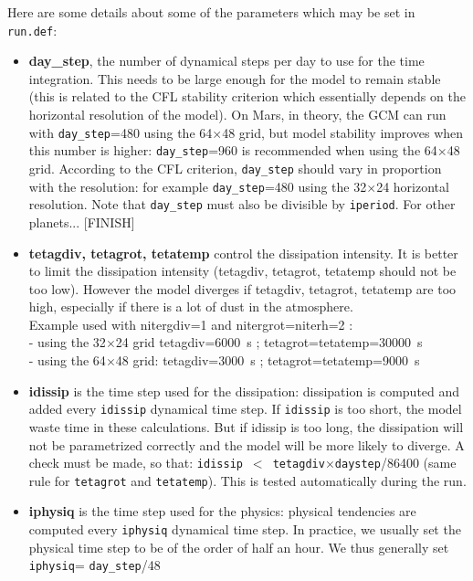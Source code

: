 \noindent Here are some details about some of the parameters which may be
set in {\tt run.def}:
\begin{itemize}
\item {\bf day\_step}, the number of dynamical steps per day to use for
the time integration. This needs to be large enough for the model
to remain stable (this is related to the CFL stability criterion
which essentially depends on the horizontal resolution of the model).
On Mars, in theory, the GCM can run with
{\tt day\_step}=480 using the 64$\times$48 grid, but model stability
improves when this number is higher: {\tt day\_step}=960 is recommended
 when using the 64$\times$48 grid. According to the CFL criterion,
{\tt day\_step} should vary in proportion with the resolution: for example
{\tt day\_step}=480 using the 32$\times$24 horizontal resolution.
Note that {\tt day\_step} must also be divisible by {\tt iperiod}. For other planets... [FINISH]

\item {\bf tetagdiv, tetagrot, tetatemp} control the dissipation intensity.
It is better to limit the dissipation intensity
(tetagdiv, tetagrot, tetatemp should not be too low).
However the model diverges if tetagdiv, tetagrot, tetatemp are too high,
especially if there is a lot of dust in the atmosphere. \\
Example used with nitergdiv=1 and  nitergrot=niterh=2 : \\
- using the 32$\times$24 grid tetagdiv=6000~s ; tetagrot=tetatemp=30000~s \\
- using the 64$\times$48 grid: tetagdiv=3000~s ; tetagrot=tetatemp=9000~s

\item {\bf idissip} is the time step used for the dissipation:
dissipation is computed and added every {\tt idissip} dynamical
time step. If {\tt idissip} is
too short, the model waste time in these calculations. But if idissip is too
long, the  dissipation will not be parametrized correctly and the  model will
be more likely to diverge.
A check must be made, so that:
{\tt idissip}~$<$~{\tt tetagdiv}$\times${\tt daystep}/86400
(same rule for {\tt tetagrot} and {\tt tetatemp}).
This is tested automatically during the run.

\item {\bf iphysiq} is the time step used for the physics:
physical tendencies are computed every {\tt iphysiq} dynamical time step.
In practice, we
usually set the physical time step to be of the order of half an hour.
We thus generally set {\tt iphysiq}= {\tt day\_step}/48

\end{itemize}


